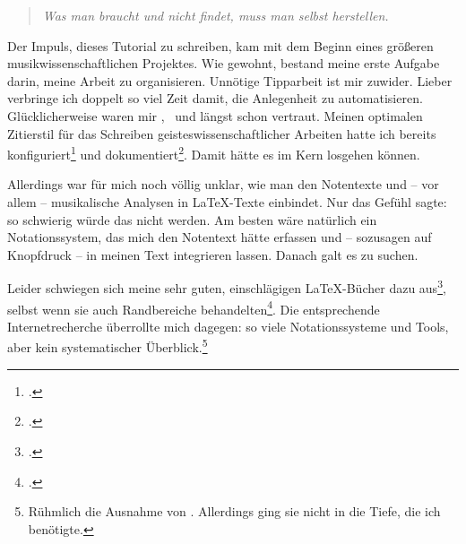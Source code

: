%
%
%



\begin{quote}\textit{Was man braucht und nicht findet, muss man selbst herstellen.}
\end{quote}

Der Impuls, dieses Tutorial zu schreiben, kam mit dem Beginn eines größeren
musikwissenschaftlichen Projektes. Wie gewohnt, bestand meine erste Aufgabe
darin, meine Arbeit zu organisieren. Unnötige Tipparbeit ist mir zuwider. Lieber
verbringe ich doppelt so viel Zeit damit, die Anlegenheit zu automatisieren.
Glücklicherweise waren mir \acc{\LaTeX}, \ und  längst
schon vertraut. Meinen optimalen Zitierstil für das Schreiben
geisteswissenschaftlicher Arbeiten hatte ich bereits
konfiguriert\footcite[vgl.][\nopage wp]{Reincke2018a} und
dokumentiert\footcite[vgl][2ff]{Reincke2018b}. Damit hätte es im Kern losgehen
können.

Allerdings war für mich noch völlig unklar, wie man den Notentexte und -- vor
allem -- musikalische Analysen in \LaTeX-Texte einbindet. Nur das Gefühl sagte:
so schwierig würde das nicht werden. Am besten wäre natürlich ein
No\-ta\-tions\-system, das mich den Notentext hätte erfassen und -- sozusagen auf
Knopfdruck -- in meinen Text integrieren lassen. Danach galt es zu suchen.

Leider schwiegen sich meine sehr guten, einschlägigen \LaTeX-Bücher dazu
aus\footcite[vgl.][vi ff, insbesondere 905 u. 909: das umfangreiche Register
erwähnt weder Musik im allgemeinen noch LilyPond oder MusiX\TeX\ im
Besonderen]{Voss2012a}, selbst wenn sie auch Randbereiche
behandelten\footcite[vgl.][vii ff, insbesondere 1080 u.
1087: auch dieses umfangreiche Register erwähnt weder Musik im allgemeinen noch
LilyPond oder MusiX\TeX\ im Besonderen.]{MitGoo2005a}. Die entsprechende
Internetrecherche überrollte mich dagegen: so viele Notationssysteme und Tools,
aber kein systematischer Überblick.\footnote{Rühmlich die Ausnahme von
\cite[][\nopage wp]{Thoma2018a}. Allerdings ging sie nicht in die Tiefe, die ich
benötigte.}

